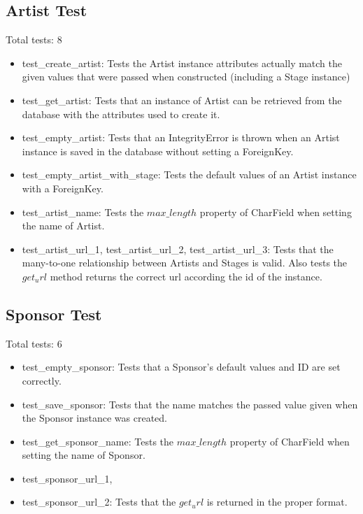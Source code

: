 \documentclass[12pt,english]{scrartcl}
\begin{document}
\subsection{Artist Test}
Total tests: 8
\begin{itemize}
\item test\_create\_artist: Tests the Artist instance attributes actually match the given values
that were passed when constructed (including a Stage instance)
 
\item test\_get\_artist: Tests that an instance of Artist can be retrieved from the database with the attributes used to create it.
 
\item test\_empty\_artist: Tests that an IntegrityError is thrown when an Artist instance is saved in the database without setting a ForeignKey.
 
\item test\_empty\_artist\_with\_stage: Tests the default values of an Artist instance with a ForeignKey.
 
\item test\_artist\_name: Tests the $max\_length$ property of CharField when setting the name of Artist.
 
\item test\_artist\_url\_1, test\_artist\_url\_2, test\_artist\_url\_3: Tests that the many-to-one relationship between
Artists and Stages is valid. Also tests the $get_url$ method returns the correct url according the id of the instance.
\end{itemize} 

\subsection{Sponsor Test} 
Total tests: 6
\begin{itemize}
\item test\_empty\_sponsor: Tests that a Sponsor's default values and ID are set correctly.
 
\item test\_save\_sponsor: Tests that the name matches the passed value given when the Sponsor instance was created.  
 
\item test\_get\_sponsor\_name: Tests the $max\_length$ property of CharField when setting the name of Sponsor.

\item test\_sponsor\_url\_1, \item test\_sponsor\_url\_2: Tests that the $get_url$ is returned in the proper format.
\end{itemize}
\end{document}
